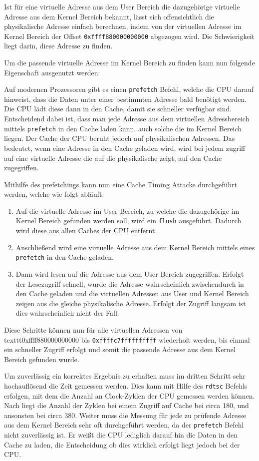 \documentclass[conference]{IEEEtran}
\begin{document}
Ist für eine virtuelle Adresse aus dem User Bereich die dazugehörige virtuelle Adresse aus dem Kernel Bereich bekannt, lässt sich offensichtlich die physikalische Adresse einfach berechnen, indem von der virtuellen Adresse im Kernel Bereich der Offset \texttt{0xffff880000000000} abgezogen wird. Die Schwierigkeit liegt darin, diese Adresse zu finden. 


Um die passende virtuelle Adresse im Kernel Bereich zu finden kann nun folgende Eigenschaft ausgenutzt werden:

Auf modernen Prozessoren gibt es einen \texttt{prefetch} Befehl, welche die CPU darauf hinweist, dass die Daten unter einer bestimmten Adresse bald benötigt werden. Die CPU lädt diese dann in den Cache, damit sie schneller verfügbar sind. Entscheidend dabei ist, dass man jede Adresse aus dem virtuellen Adressbereich mittels \texttt{prefetch} in den Cache laden kann, auch solche die im Kernel Bereich liegen. Der Cache der CPU beruht jedoch auf physikalischen Adressen. Das bedeutet, wenn eine Adresse in den Cache geladen wird, wird bei jedem zugriff auf eine virtuelle Adresse die auf die physikalische zeigt, auf den Cache zugegriffen.

Mithilfe des prefetchings kann nun eine Cache Timing Attacke durchgeführt werden, welche wie folgt abläuft:
\begin{enumerate}
	\item Auf die virtuelle Adresse im User Bereich, zu welche die dazugehörige im Kernel Bereich gefunden werden soll, wird ein \texttt{flush} ausgeführt. Dadurch wird diese aus allen Caches der CPU entfernt. 
	\item Anschließend wird eine virtuelle Adresse aus dem Kernel Bereich mittels eines \texttt{prefetch} in den Cache geladen.
	\item Dann wird lesen auf die Adresse aus dem User Bereich zugegriffen. Erfolgt der Lesezugriff schnell, wurde die Adresse wahrscheinlich zwischendurch in den Cache geladen und die virtuellen Adressen aus User und Kernel Bereich zeigen aus die gleiche physikalische Adresse. Erfolgt der Zugriff langsam ist dies wahrscheinlich nicht der Fall.
\end{enumerate}

Diese Schritte können nun für alle virtuellen Adressen von texttt{0xffff880000000000} bis \texttt{0xffffc7ffffffffff} wiederholt werden, bis einmal ein schneller Zugriff erfolgt und somit die passende Adresse aus dem Kernel Bereich gefunden wurde.

Um zuverlässig ein korrektes Ergebnis zu erhalten muss im dritten Schritt sehr hochauflösend die Zeit gemessen werden. Dies kann mit Hilfe des \texttt{rdtsc} Befehls erfolgen, mit dem die Anzahl an Clock-Zyklen der CPU gemessen werden können. Nach \cite{DBLP:conf/ccs/2016} liegt die Anzahl der Zyklen bei einem Zugriff auf Cache bei circa 180, und ansonsten bei circa 380.
Weiter muss die Messung für jede zu prüfende Adresse aus dem Kernel Bereich sehr oft durchgeführt werden, da der \texttt{prefetch} Befehl nicht zuverlässig ist. Er weißt die CPU lediglich darauf hin die Daten in den Cache zu laden, die Entscheidung ob dies wirklich erfolgt liegt jedoch bei der CPU.
\end{document}
